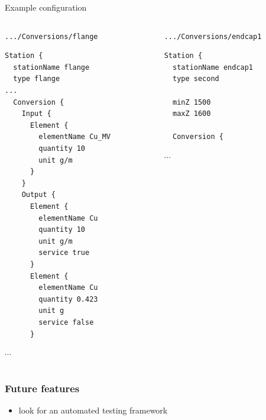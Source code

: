 \documentclass[pdftex, 11pt]{beamer}
\newcommand{\pat}[1]{\texttt{#1}}
\begin{document}
\begin{frame}[fragile]{Example configuration}
  \tiny
  \begin{columns}[t]
    \begin{column}{0.47\textwidth}
      \begin{block}{\pat{.../Conversions/flange}}
\begin{verbatim}
Station {
  stationName flange
  type flange
...
  Conversion {
    Input {
      Element {
        elementName Cu_MV
        quantity 10
        unit g/m
      }
    }
    Output {
      Element {
        elementName Cu
        quantity 10
        unit g/m
        service true
      }
      Element {
        elementName Cu
        quantity 0.423
        unit g
        service false
      }
\end{verbatim}
$\cdots$
      \end{block}
    \end{column}
    \begin{column}{0.47\textwidth}
      \begin{block}{\pat{.../Conversions/endcap1}}
\begin{verbatim}
Station {
  stationName endcap1
  type second

  minZ 1500
  maxZ 1600

  Conversion {
\end{verbatim}
$\cdots$
      \end{block}
    \end{column}
  \end{columns}
\end{frame}

\begin{frame}
  \frametitle{Future features}
  \begin{itemize}
  \item look for an automated testing framework
  \end{itemize}
\end{frame}
\end{document}
